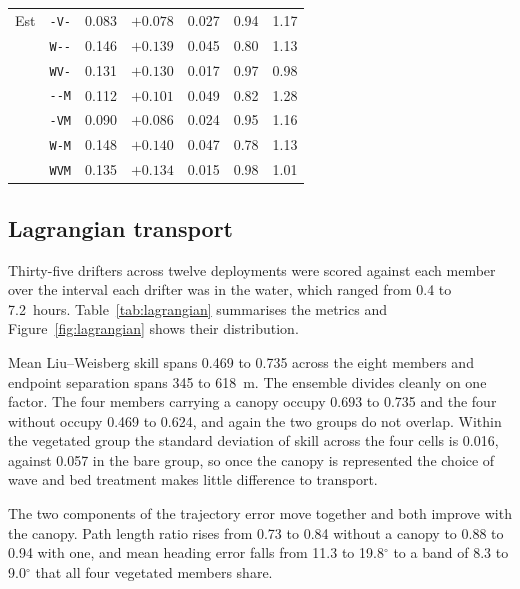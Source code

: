 \begin{table}[H]
\begin{tabular}{llrrrrr}
    Est      & \texttt{{-}V{-}}   & 0.083 & $+0.078$ & 0.027 & 0.94 & 1.17 \\
             & \texttt{W{-}{-}}   & 0.146 & $+0.139$ & 0.045 & 0.80 & 1.13 \\
             & \texttt{WV{-}}     & 0.131 & $+0.130$ & 0.017 & 0.97 & 0.98 \\
             & \texttt{{-}{-}M}   & 0.112 & $+0.101$ & 0.049 & 0.82 & 1.28 \\
             & \texttt{{-}VM}     & 0.090 & $+0.086$ & 0.024 & 0.95 & 1.16 \\
             & \texttt{W{-}M}     & 0.148 & $+0.140$ & 0.047 & 0.78 & 1.13 \\
             & \texttt{WVM}       & 0.135 & $+0.134$ & 0.015 & 0.98 & 1.01 \\
      \bottomrule
  \end{tabular}
\end{table}

\subsection{Lagrangian transport}
\label{sec:res_drifters}

Thirty-five drifters across twelve deployments were scored against each member
over the interval each drifter was in the water, which ranged from 0.4 to
7.2~hours. Table~\ref{tab:lagrangian} summarises the metrics and
Figure~\ref{fig:lagrangian} shows their distribution.

Mean Liu--Weisberg skill spans 0.469 to 0.735 across the eight members and
endpoint separation spans 345 to 618~m. The ensemble divides cleanly on one
factor. The four members carrying a canopy occupy 0.693 to 0.735 and the four
without occupy 0.469 to 0.624, and again the two groups do not overlap. Within
the vegetated group the standard deviation of skill across the four cells is
0.016, against 0.057 in the bare group, so once the canopy is represented the
choice of wave and bed treatment makes little difference to transport.

The two components of the trajectory error move together and both improve with
the canopy. Path length ratio rises from 0.73 to 0.84 without a canopy to 0.88
to 0.94 with one, and mean heading error falls from 11.3 to 19.8$^\circ$ to a
band of 8.3 to 9.0$^\circ$ that all four vegetated members share.

